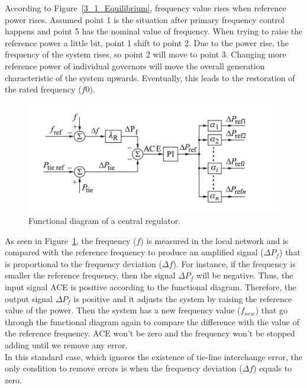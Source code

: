 According to Figure~\ref{3_1_Equilibrium}, frequency value rises when reference power rises. Assumed point 1 is the situation after primary frequency control happens and point 5 has the nominal value of frequency. When trying to raise the reference power a little bit, point 1 shift to point 2. Due to the power rise, the frequency of the system rises, so point 2 will move to point 3. Changing more reference power of individual governors will move the overall generation characteristic of the system upwards. Eventually, this leads to the restoration of the rated frequency ($f0$). \\

\begin{figure}[t]
\center
\includegraphics[scale=0.42]{figure/3_1_Functional.png}
\caption{Functional diagram of a central regulator.}
\label{3_1_Functional}
\end{figure}

As seen in Figure~\ref{3_1_Functional}, the frequency ($f$) is measured in the local network and is compared with the reference frequency to produce an amplified signal ($\Delta P_f$) that is proportional to the frequency deviation ($\Delta f$). For instance, if the frequency is smaller the reference frequency, then the signal $\Delta P_f$ will be negative. Thus, the input signal ACE is positive according to the functional diagram. Therefore, the output signal $\Delta P_f$ is positive and it adjusts the system by raising the reference value of the power. Then the system has a new frequency value ($f_{n e w}$) that go through the functional diagram again to compare the difference with the value of the reference frequency. ACE won’t be zero and the frequency won’t be stopped adding until we remove any error. \\

In this standard case, which ignores the existence of tie-line interchange error, the only condition to remove errors is when the frequency deviation ($\Delta f$) equals to zero. \\

